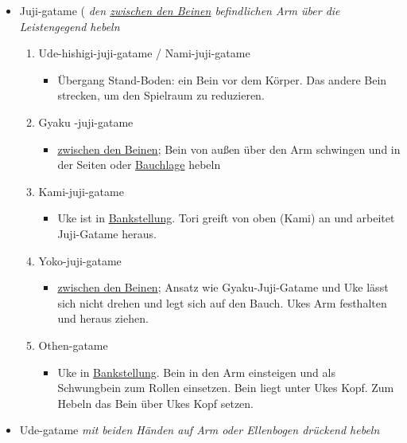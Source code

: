 \documentclass[justified, a4paper, notitlepage, captions=tableheading, nobib]{tufte-handout}
\begin{document}
\begin{itemize}
\item Juji-gatame (
\emph{den \hyperref[orga527e99]{zwischen den Beinen} befindlichen Arm über die Leistengegend hebeln}

\begin{enumerate}
\item Ude-hishigi-juji-gatame / Nami-juji-gatame
\begin{itemize}
\item Übergang Stand-Boden: ein Bein vor dem Körper. Das andere Bein strecken, um den Spielraum zu reduzieren.
\end{itemize}
\item Gyaku -juji-gatame 
\begin{itemize}
\item \hyperref[orga527e99]{zwischen den Beinen}; Bein von außen über den Arm schwingen und in der Seiten oder \hyperref[orgffa54d6]{Bauchlage} hebeln
\end{itemize}
\item Kami-juji-gatame 
\begin{itemize}
\item Uke ist in \hyperref[orgf95c5ab]{Bankstellung}. Tori greift von oben (Kami) an und arbeitet Juji-Gatame heraus.
\end{itemize}
\item Yoko-juji-gatame
\begin{itemize}
\item \hyperref[orga527e99]{zwischen den Beinen}; Ansatz wie Gyaku-Juji-Gatame und Uke lässt sich nicht drehen und legt sich auf den Bauch. Ukes Arm festhalten und heraus ziehen.
\end{itemize}
\item Othen-gatame 
\begin{itemize}
\item Uke in \hyperref[orgf95c5ab]{Bankstellung}. Bein in den Arm einsteigen und als Schwungbein zum Rollen einsetzen. Bein liegt unter Ukes Kopf. Zum Hebeln das Bein über Ukes Kopf setzen.
\end{itemize}
\end{enumerate}

\item Ude-gatame 
\emph{mit beiden Händen auf Arm oder Ellenbogen drückend hebeln}


\end{itemize}
\end{document}
